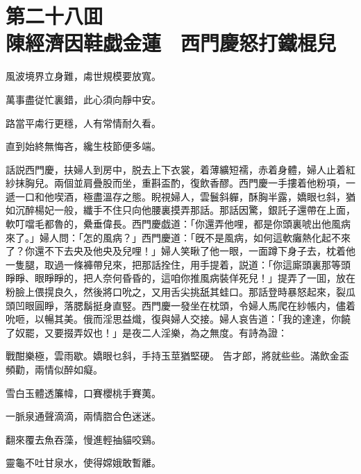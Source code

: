 
\chapter*{第二十八囬　\\陳經濟因鞋戯金蓮　西門慶怒打鐵棍兒}


\begin{myquote}
風波境界立身難，䖏世規模要放寬。

萬事盡従忙裏錯，此心須向靜中安。

路當平䖏行更穩，人有常情耐久看。

直到始終無悔吝，纔生枝節便多端。
\end{myquote}

話説西門慶，扶婦人到房中，脱去上下衣裳，着薄纊短襦，赤着身體，婦人止着紅紗抹胸兒。兩個並肩疊股而坐，重斟盃酌，復飲香醪。西門慶一手摟着他粉項，一遞一口和他喫酒，極盡溫存之態。睨視婦人，雲鬟斜軃，酥胸半露，嬌眼乜斜，猶如沉醉楊妃一般，纖手不住只向他腰裏摸弄那話。那話因驚，銀託子還帶在上面，軟叮噹毛都魯的，纍垂偉長。西門慶戯道：「你還弄他哩，都是你頭裏唬出他風病來了。」婦人問：「怎的風病？」西門慶道：「旣不是風病，如何這軟癱熱化起不來了？你還不下去央及他央及兒哩！」婦人笑瞅了他一眼，一面蹲下身子去，枕着他一隻腿，取過一條褲帶兒來，把那話拴住，用手提着，説道：「你這廝頭裏那等頭睜睜、眼睜睜的，把人奈何昏昏的，這咱你推風病裝佯死兒！」提弄了一囬，放在粉臉上偎㨪良久，然後將口吮之，又用舌尖挑舐其蛙口。那話登時暴怒起來，裂瓜頭凹眼圓睜，落腮鬍挺身直竪。西門慶一發坐在枕頭，令婦人馬爬在紗帳内，儘着吮咂，以暢其美。俄而淫思益熾，復與婦人交接。婦人哀告道：「我的達達，你饒了奴罷，又要掇弄奴也！」是夜二人淫樂，為之無度。有詩為證：

\begin{myquote}
戰酣樂極，雲雨歇。嬌眼乜斜，手持玉莖猶堅硬。
告才郎，將就些些。滿飲金盃頻勸，兩情似醉如癡。
\end{myquote}

\begin{myquote}
雪白玉體透簾幃，口賽櫻桃手賽荑。

一脈泉通聲滴滴，兩情脗合色迷迷。

翻來覆去魚吞藻，慢進輕抽貓咬鷄。

靈龜不吐甘泉水，使得嫦娥敢暫離。
\end{myquote}

